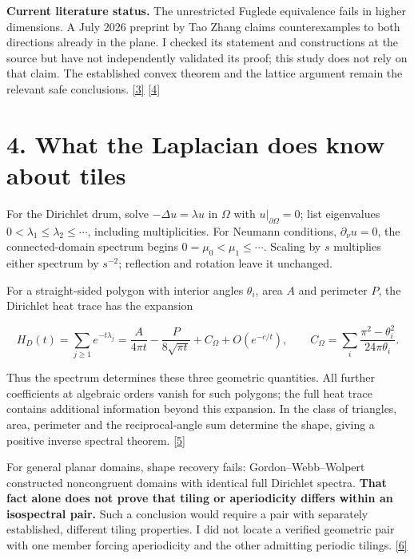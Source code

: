 \documentclass[11pt]{article}
\begin{document}
\textbf{Current literature status.} The unrestricted Fuglede equivalence fails in higher dimensions. A July 2026 preprint by Tao Zhang claims counterexamples to both directions already in the plane. I checked its statement and constructions at the source but have not independently validated its proof; this study does not rely on that claim. The established convex theorem and the lattice argument remain the relevant safe conclusions. \hyperlink{ref3}{[3]} \hyperlink{ref4}{[4]}




\section*{4. What the Laplacian does know about tiles}


For the Dirichlet drum, solve \(-\Delta u=\lambda u\) in \(\Omega\) with \(u|_{\partial\Omega}=0\); list eigenvalues \(0<\lambda_1\le\lambda_2\le\cdots\), including multiplicities. For Neumann conditions, \(\partial_\nu u=0\), the connected-domain spectrum begins \(0=\mu_0<\mu_1\le\cdots\). Scaling by \(s\) multiplies either spectrum by \(s^{-2}\); reflection and rotation leave it unchanged.



For a straight-sided polygon with interior angles \(\theta_i\), area \(A\) and perimeter \(P\), the Dirichlet heat trace has the expansion


\[ H_D(t)=\sum_{j\ge1}e^{-t\lambda_j}=\frac{A}{4\pi t}-\frac{P}{8\sqrt{\pi t}}+C_\Omega+O(e^{-c/t}),\qquad C_\Omega=\sum_i\frac{\pi^2-\theta_i^2}{24\pi\theta_i}. \]

Thus the spectrum determines these three geometric quantities. All further coefficients at algebraic orders vanish for such polygons; the full heat trace contains additional information beyond this expansion. In the class of triangles, area, perimeter and the reciprocal-angle sum determine the shape, giving a positive inverse spectral theorem. \hyperlink{ref5}{[5]}



For general planar domains, shape recovery fails: Gordon--Webb--Wolpert constructed noncongruent domains with identical full Dirichlet spectra. \textbf{That fact alone does not prove that tiling or aperiodicity differs within an isospectral pair.} Such a conclusion would require a pair with separately established, different tiling properties. I did not locate a verified geometric pair with one member forcing aperiodicity and the other admitting periodic tilings. \hyperlink{ref6}{[6]}
\end{document}
